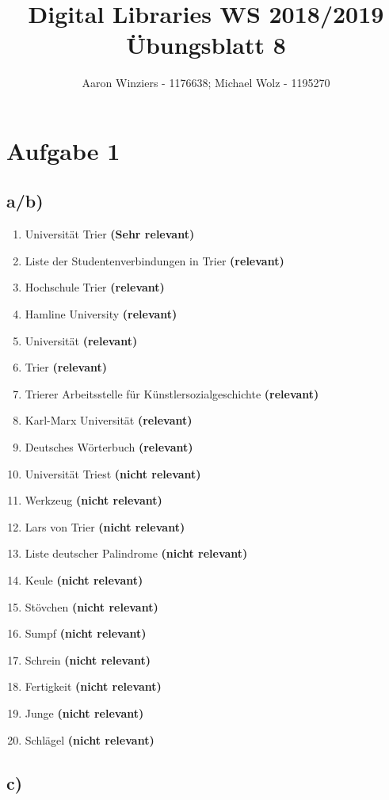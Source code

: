 \documentclass[11pt,a4paper,parskip=half ]{scrartcl}
\author{Aaron Winziers - 1176638; Michael Wolz - 1195270}
\title{Digital Libraries WS 2018/2019\\\LARGE{Übungsblatt 8}}
\begin{document}
	\maketitle
	
	\section*{Aufgabe 1}
	
	\subsection*{a/b)}
	\begin{enumerate}
		\item Universität Trier \textbf{(Sehr relevant)}
		\item Liste der Studentenverbindungen in Trier \textbf{(relevant)}
		\item Hochschule Trier \textbf{(relevant)}
		\item Hamline University \textbf{(relevant)}
		\item Universität \textbf{(relevant)}
		\item Trier \textbf{(relevant)}
		\item Trierer Arbeitsstelle für Künstlersozialgeschichte \textbf{(relevant)}
		\item Karl-Marx Universität \textbf{(relevant)}
		\item Deutsches Wörterbuch \textbf{(relevant)}
		\item Universität Triest \textbf{(nicht relevant)}
		\item Werkzeug \textbf{(nicht relevant)}
		\item Lars von Trier \textbf{(nicht relevant)}
		\item Liste deutscher Palindrome \textbf{(nicht relevant)}
		\item Keule \textbf{(nicht relevant)}
		\item Stövchen \textbf{(nicht relevant)}
		\item Sumpf \textbf{(nicht relevant)}
		\item Schrein \textbf{(nicht relevant)}
		\item Fertigkeit \textbf{(nicht relevant)}
		\item Junge \textbf{(nicht relevant)}
		\item Schlägel \textbf{(nicht relevant)}
	\end{enumerate} 
	
	\subsection*{c)}
	
\end{document}
